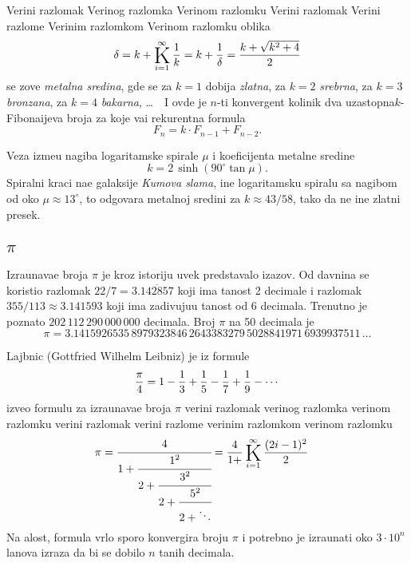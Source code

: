\documentclass[12pt, twoside, a4paper]{article}
\def\vr#1{\ifcase#1\relax\or
  ve\-ri{\zv}\-ni raz\-lo\-mak\or
  ve\-ri{\zv}\-nog raz\-lom\-ka\or
  ve\-ri{\zv}\-nom raz\-lom\-ku\or
  ve\-ri{\zv}\-ni raz\-lo\-mak\or
  ve\-ri{\zv}\-ni raz\-lom\-{\cv}e\or
  ve\-ri{\zv}\-nim raz\-lom\-kom\or
  ve\-ri{\zv}\-nom raz\-lom\-ku\fi}
\def\Vr#1{\ifcase#1\relax\or
  Ve\-ri{\zv}\-ni raz\-lo\-mak\or
  Ve\-ri{\zv}\-nog raz\-lom\-ka\or
  Ve\-ri{\zv}\-nom raz\-lom\-ku\or
  Ve\-ri{\zv}\-ni raz\-lo\-mak\or
  Ve\-ri{\zv}\-ni raz\-lom\-{\cv}e\or
  Ve\-ri{\zv}\-nim raz\-lom\-kom\or
  Ve\-ri{\zv}\-nom raz\-lom\-ku\fi}
\begin{document}
\bigskip

\Vr1 oblika
$$
\delta =k+\Kinf1k = k+{1\over \delta}={k+\sqrt{k^2+4}\over2}
$$
se zove {\sl metalna sredina}, gde se za $k=1$ dobija {\sl zlatna}, za $k=2$ {\sl srebrna},
za $k=3$ {\sl bronzana}, za $k=4$ {\sl bakarna}, \dots\ \
I ovde je $n$-ti konvergent koli{\cv}nik dva uzastopna\break $k$-Fi\-bo\-na\-{\cv}i\-je\-va broja za koje va{\zv}i
rekurentna formula
$$
F_n = k\cdot F_{n-1}+F_{n-2}.
$$ 

Veza izme{\dj}u nagiba logaritamske spirale $\mu$ i koeficijenta metalne sredine
$$
k=2\,\sinh\left(90^\circ\tan\mu\right).
$$
Spiralni kraci na{\sv}e galaksije {\sl Kumova slama}, {\cv}ine logaritamsku spiralu sa nagibom od oko 
$\mu\approx13^\circ$,
{\sv}to odgovara metalnoj sredini za 
$k\approx 43/58$,
tako da ne {\cv}ine zlatni presek. 


\subsection{$\pi$}

Izra{\cv}unava{\nj}e broja $\pi$ je kroz istoriju uvek predstav{\lj}alo izazov.
Od davnina se koristio razlomak $22/7=3.\overline{142857}$ koji ima ta{\cv}nost 2 decimale
i razlomak $355/113\approx3.141593$ koji ima zadiv{\lj}uju{\cc}u ta{\cv}nost od 6 decimala.
Trenutno je poznato $202\,112\,290\,000\,000$ decimala.
Broj $\pi$ na 50 decimala je
$$
\pi=3.
1415926535\,
8979323846\,
2643383279\,
5028841971\,
6939937511\,
\ldots
$$

\medskip

Lajbnic (Gottfried Wilhelm Leibniz) je iz formule 
$${\pi\over 4}=1-{1\over3}+{1\over5}-{1\over7}+{1\over9}-\cdots$$
izveo formulu za izra{\cv}unava{\nj}e
broja $\pi$ \vr6
\begin{align*}
\pi
&= \cfrac{4}{1+\cfrac{1^2}{2+\cfrac{3^2}{2+\cfrac{5^2}{2+\ddots}}}}
=\frac{4}{1+}\Kinf{(2i-1)^2}2
\end{align*}
Na {\zv}alost, formula vrlo sporo konvergira broju $\pi$ i potrebno je izra{\cv}unati oko
$3\cdot10^n$ {\cv}lanova izraza da bi se dobilo $n$ ta{\cv}nih decimala.

\smallskip
\end{document}
